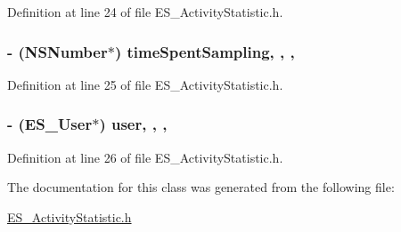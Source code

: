 Definition at line 24 of file E\+S\+\_\+\+Activity\+Statistic.\+h.

\hypertarget{interface_e_s___activity_statistic_a32841bc914809e0b86f4aadefaa41d7a}{
\subsubsection[{time\+Spent\+Sampling}]{\setlength{\rightskip}{0pt plus 5cm}-\/ (N\+S\+Number$\ast$) time\+Spent\+Sampling\hspace{0.3cm}{\ttfamily [read]}, {\ttfamily [write]}, {\ttfamily [nonatomic]}, {\ttfamily [retain]}}}\label{interface_e_s___activity_statistic_a32841bc914809e0b86f4aadefaa41d7a}


Definition at line 25 of file E\+S\+\_\+\+Activity\+Statistic.\+h.

\hypertarget{interface_e_s___activity_statistic_ad38284d32f9bb2d9a1ef1fcf6b28d446}{
\subsubsection[{user}]{\setlength{\rightskip}{0pt plus 5cm}-\/ ({\bf E\+S\+\_\+\+User}$\ast$) user\hspace{0.3cm}{\ttfamily [read]}, {\ttfamily [write]}, {\ttfamily [nonatomic]}, {\ttfamily [retain]}}}\label{interface_e_s___activity_statistic_ad38284d32f9bb2d9a1ef1fcf6b28d446}


Definition at line 26 of file E\+S\+\_\+\+Activity\+Statistic.\+h.



The documentation for this class was generated from the following file\+:\begin{DoxyCompactItemize}
\item 
\hyperlink{_e_s___activity_statistic_8h}{E\+S\+\_\+\+Activity\+Statistic.\+h}\end{DoxyCompactItemize}
